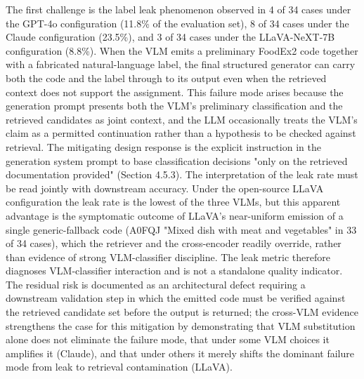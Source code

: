 The first challenge is the label leak phenomenon observed in 4 of 34 cases under the GPT-4o configuration (11.8\% of the evaluation set), 8 of 34 cases under the Claude configuration (23.5\%), and 3 of 34 cases under the LLaVA-NeXT-7B configuration (8.8\%). When the VLM emits a preliminary FoodEx2 code together with a fabricated natural-language label, the final structured generator can carry both the code and the label through to its output even when the retrieved context does not support the assignment. This failure mode arises because the generation prompt presents both the VLM's preliminary classification and the retrieved candidates as joint context, and the LLM occasionally treats the VLM's claim as a permitted continuation rather than a hypothesis to be checked against retrieval. The mitigating design response is the explicit instruction in the generation system prompt to base classification decisions "only on the retrieved documentation provided" (Section 4.5.3). The interpretation of the leak rate must be read jointly with downstream accuracy. Under the open-source LLaVA configuration the leak rate is the lowest of the three VLMs, but this apparent advantage is the symptomatic outcome of LLaVA's near-uniform emission of a single generic-fallback code (A0FQJ "Mixed dish with meat and vegetables" in 33 of 34 cases), which the retriever and the cross-encoder readily override, rather than evidence of strong VLM-classifier discipline. The leak metric therefore diagnoses VLM-classifier interaction and is not a standalone quality indicator. The residual risk is documented as an architectural defect requiring a downstream validation step in which the emitted code must be verified against the retrieved candidate set before the output is returned; the cross-VLM evidence strengthens the case for this mitigation by demonstrating that VLM substitution alone does not eliminate the failure mode, that under some VLM choices it amplifies it (Claude), and that under others it merely shifts the dominant failure mode from leak to retrieval contamination (LLaVA).

